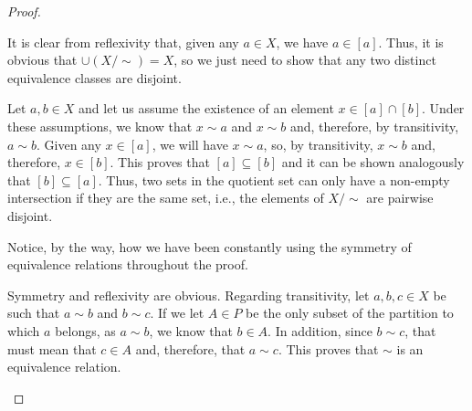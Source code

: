 \begin{proof}
\begin{parlist}
\item It is clear from reflexivity that, given any $a\in X$, we have $a\in [a]$.
Thus, it is obvious that $\cup (X/{\sim}) = X$, so we just need to show that any two distinct equivalence classes are disjoint.

Let $a,b\in X$ and let us assume the existence of an element $x\in [a]\cap [b]$.
Under these assumptions, we know that $x\sim a$ and $x\sim b$ and, therefore, by transitivity, $a\sim b$. Given any $x\in [a]$, we will have $x\sim a$, so, by transitivity, $x\sim b$ and, therefore, $x\in [b]$.
This proves that $[a]\subseteq [b]$ and it can be shown analogously that $[b] \subseteq [a]$.
Thus, two sets in the quotient set can only have a non-empty intersection if they are the same set, i.e., the elements of $X/{\sim}$ are pairwise disjoint. 

Notice, by the way, how we have been constantly using the symmetry of equivalence relations throughout the proof.

\item Symmetry and reflexivity are obvious. Regarding transitivity, let $a,b, c\in X$ be such that $a\sim b$ and $b\sim c$. If we let $A\in P$ be the only subset of the partition to which $a$ belongs, as $a\sim b$, we know that $b\in A$. In addition, since $b\sim c$, that must mean that $c\in A$ and, therefore, that $a\sim c$. This proves that $\sim$ is an equivalence relation.
\end{parlist}
\end{proof}

